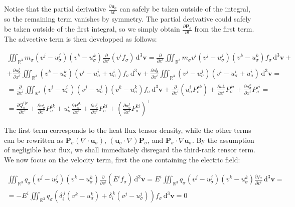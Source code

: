 Notice that the partial derivative $\frac{\partial \mathbf{u}_\sigma}{\partial t}$ can safely be taken outside of the integral, so the remaining term vanishes by symmetry. The partial derivative could safely be taken outside of the first integral, so we simply obtain $\frac{\partial \mathbf{P}_\sigma}{\partial t}$ from the first term. The advective term is then developped as follows:

\begin{gather*}
    \iiint_{\mathbb{R}^3}m_\sigma \left(v^j-u_\sigma^j\right)\left(v^k-u_\sigma^k\right)\frac{\partial}{\partial x^i}\left(v^if_\sigma\right)\,\mathrm{d^3}\mathbf{v}=\frac{\partial }{\partial x^i}\iiint_{\mathbb{R}^3}m_\sigma v^i\left(v^j-u_\sigma^j\right)\left(v^k-u_\sigma^k\right)f_\sigma\,\mathrm{d^3}\mathbf{v}+\\
    +\frac{\partial u_\sigma^j}{\partial x^i}\iiint_{\mathbb{R}^3}\left(v^k-u_\sigma^k\right)\left(v^i-u_\sigma^i+u_\sigma^i\right)f_\sigma\,\mathrm{d^3}\mathbf{v}+\frac{\partial u_\sigma^k}{\partial x^i}\iiint_{\mathbb{R}^3}\left(v^j-u_\sigma^j\right)\left(v^i-u_\sigma^i+u_\sigma^i\right)\,\mathrm{d^3}\mathbf{v}=\\
    =\frac{\partial }{\partial x^i}\iiint_{\mathbb{R}^3}\left(v^i-u_\sigma^i\right)\left(v^j-u_\sigma^j\right)\left(v^k-u_\sigma^k\right)f_\sigma\,\mathrm{d^3}\mathbf{v}+\frac{\partial }{\partial x^i}\left(u_\sigma^iP_\sigma^{jk}\right)+\frac{\partial u_\sigma^j}{\partial x^i}P_\sigma^{ki}+\frac{\partial u_\sigma^k}{\partial x^i}P_\sigma^{ji}=\\
    =\frac{\partial Q_\sigma^{ijk}}{\partial x^i}+\frac{\partial u_\sigma^i}{\partial x^i}P_\sigma^{jk}+u_\sigma^i \frac{\partial P_\sigma^{jk}}{\partial x^i}+\frac{\partial u_\sigma^j}{\partial x^i}P_\sigma^{ki}+\left(\frac{\partial u_\sigma^j}{\partial x^i}P_\sigma^{ki}\right)^\top
\end{gather*}

The first term corresponds to the heat flux tensor density, while the other terms can be rewritten as $\mathbf{P}_\sigma \left(\nabla\cdot{\mathbf{u}_\sigma}\right)$, $\left(\mathbf{u}_\sigma\cdot\nabla\right)\mathbf{P}_\sigma$, and $\mathbf{P}_\sigma\cdot\nabla \mathbf{u}_\sigma$. By the assumption of negligible heat flux, we shall immediately disregard the third-rank tensor term. We now focus on the velocity term, first the one containing the electric field:

\begin{gather*}
    \iiint_{\mathbb{R}^3}q_\sigma \left(v^j-u_\sigma^j\right)\left(v^k-u_\sigma^k\right)\frac{\partial }{\partial v^i}\left(E^if_\sigma\right)\,\mathrm{d^3}\mathbf{v}=E^i\iiint_{\mathbb{R}^3}q_\sigma \left(v^j-u_\sigma^j\right)\left(v^k-u_\sigma^k\right)\frac{\partial f_\sigma}{\partial v^i}\,\mathrm{d^3}\mathbf{v}=\\
    =-E^i\iiint_{\mathbb{R}^3}q_\sigma\left(\delta_i^{\,j} \left(v^k-u_\sigma^k\right)+\delta_i^{\,k} \left(v^j-u_\sigma^j\right)\right)f_\sigma\,\mathrm{d^3}\mathbf{v}=0
\end{gather*}

